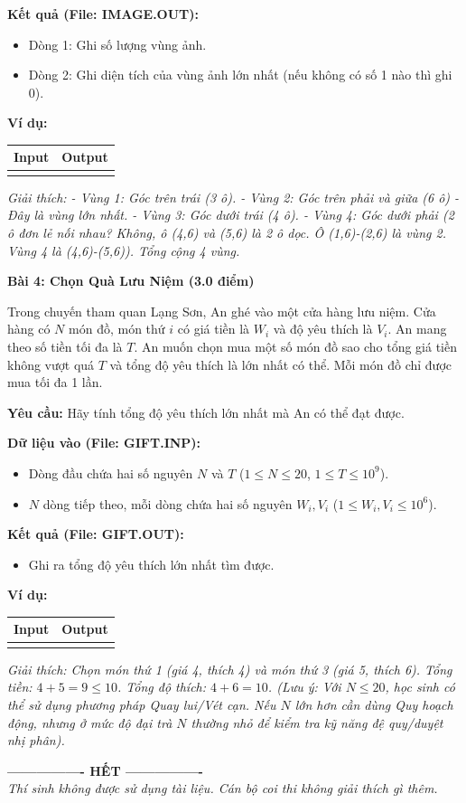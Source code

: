\documentclass[11pt, a4paper]{article}
\newcommand{\bai}[2]{\vspace{0.5cm}\noindent\textbf{Bài #1: #2}}
\newcommand{\iobox}[2]{
    \begin{center}
    \begin{tabularx}{0.8\textwidth}{|X|X|}
    \hline
    \textbf{Input} & \textbf{Output} \\
    \hline
    \vtop{#1} & \vtop{#2} \\
    \hline
    \end{tabularx}
    \end{center}
}
\begin{document}
\textbf{Kết quả (File: IMAGE.OUT):}
\begin{itemize}
    \item Dòng 1: Ghi số lượng vùng ảnh.
    \item Dòng 2: Ghi diện tích của vùng ảnh lớn nhất (nếu không có số 1 nào thì ghi 0).
\end{itemize}

\textbf{Ví dụ:}
\iobox{
5 6 \newline
1 1 0 0 0 1 \newline
1 0 0 1 1 1 \newline
0 0 0 1 0 0 \newline
1 1 0 1 0 1 \newline
1 1 0 0 0 1
}{
4 \newline
6
}
\textit{Giải thích:
- Vùng 1: Góc trên trái (3 ô).
- Vùng 2: Góc trên phải và giữa (6 ô) - Đây là vùng lớn nhất.
- Vùng 3: Góc dưới trái (4 ô).
- Vùng 4: Góc dưới phải (2 ô đơn lẻ nối nhau? Không, ô (4,6) và (5,6) là 2 ô dọc. Ô (1,6)-(2,6) là vùng 2. Vùng 4 là (4,6)-(5,6)).
Tổng cộng 4 vùng.}

\bai{4}{Chọn Quà Lưu Niệm (3.0 điểm)}

Trong chuyến tham quan Lạng Sơn, An ghé vào một cửa hàng lưu niệm. Cửa hàng có $N$ món đồ, món thứ $i$ có giá tiền là $W_i$ và độ yêu thích là $V_i$. An mang theo số tiền tối đa là $T$. An muốn chọn mua một số món đồ sao cho tổng giá tiền không vượt quá $T$ và tổng độ yêu thích là lớn nhất có thể. Mỗi món đồ chỉ được mua tối đa 1 lần.

\textbf{Yêu cầu:} Hãy tính tổng độ yêu thích lớn nhất mà An có thể đạt được.

\textbf{Dữ liệu vào (File: GIFT.INP):}
\begin{itemize}
    \item Dòng đầu chứa hai số nguyên $N$ và $T$ ($1 \le N \le 20$, $1 \le T \le 10^9$).
    \item $N$ dòng tiếp theo, mỗi dòng chứa hai số nguyên $W_i, V_i$ ($1 \le W_i, V_i \le 10^6$).
\end{itemize}

\textbf{Kết quả (File: GIFT.OUT):}
\begin{itemize}
    \item Ghi ra tổng độ yêu thích lớn nhất tìm được.
\end{itemize}

\textbf{Ví dụ:}
\iobox{
4 10 \newline
4 4 \newline
3 3 \newline
5 6 \newline
2 1
}{
10
}
\textit{Giải thích: Chọn món thứ 1 (giá 4, thích 4) và món thứ 3 (giá 5, thích 6). Tổng tiền: $4+5=9 \le 10$. Tổng độ thích: $4+6=10$.
(Lưu ý: Với $N \le 20$, học sinh có thể sử dụng phương pháp Quay lui/Vét cạn. Nếu $N$ lớn hơn cần dùng Quy hoạch động, nhưng ở mức độ đại trà $N$ thường nhỏ để kiểm tra kỹ năng đệ quy/duyệt nhị phân).}

\vspace{1cm}
\begin{center}
    \textbf{---------------- HẾT ----------------} \\
    \textit{Thí sinh không được sử dụng tài liệu. Cán bộ coi thi không giải thích gì thêm.}
\end{center}
\end{document}
